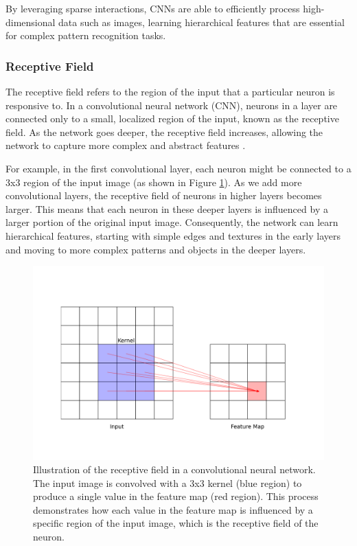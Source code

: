 \documentclass[english,11pt,a4paper,titlepage]{article}
\begin{document}
	By leveraging sparse interactions, CNNs are able to efficiently process high-dimensional data such as images, learning hierarchical features that are essential for complex pattern recognition tasks.
	
	\subsubsection*{Receptive Field}
	The receptive field refers to the region of the input that a particular neuron is responsive to. In a convolutional neural network (CNN), neurons in a layer are connected only to a small, localized region of the input, known as the receptive field. As the network goes deeper, the receptive field increases, allowing the network to capture more complex and abstract features \cite{osheaIntroductionConvolutionalNeural2015}.
	
	For example, in the first convolutional layer, each neuron might be connected to a 3x3 region of the input image (as shown in Figure \ref{fig:nn_receptivefield}). As we add more convolutional layers, the receptive field of neurons in higher layers becomes larger. This means that each neuron in these deeper layers is influenced by a larger portion of the original input image. Consequently, the network can learn hierarchical features, starting with simple edges and textures in the early layers and moving to more complex patterns and objects in the deeper layers.
	
	\begin{figure}[h]
		\centering
		\includegraphics[width=0.9\linewidth]{img/receptive_field.png}
		\caption{Illustration of the receptive field in a convolutional neural network. The input image is convolved with a 3x3 kernel (blue region) to produce a single value in the feature map (red region). This process demonstrates how each value in the feature map is influenced by a specific region of the input image, which is the receptive field of the neuron.}
		\label{fig:nn_receptivefield}
	\end{figure}
	
\end{document}
